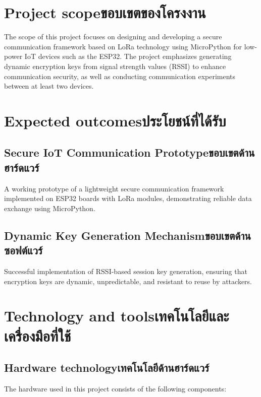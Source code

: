 \section{\ifenglish Project scope\else ขอบเขตของโครงงาน\fi}
The scope of this project focuses on designing and developing a secure communication framework based on LoRa technology using MicroPython for low-power IoT devices such as the ESP32. The project emphasizes generating dynamic encryption keys from signal strength values (RSSI) to enhance communication security, as well as conducting communication experiments between at least two devices.

\section{\ifenglish Expected outcomes\else ประโยชน์ที่ได้รับ\fi}

\subsection{\ifenglish Secure IoT Communication Prototype\else ขอบเขตด้านฮาร์ดแวร์\fi}

A working prototype of a lightweight secure communication framework implemented on ESP32 boards with LoRa modules, demonstrating reliable data exchange using MicroPython.


\subsection{\ifenglish  Dynamic Key Generation Mechanism\else ขอบเขตด้านซอฟต์แวร์\fi}

Successful implementation of RSSI-based session key generation, ensuring that encryption keys are dynamic, unpredictable, and resistant to reuse by attackers.


\section{\ifenglish Technology and tools\else เทคโนโลยีและเครื่องมือที่ใช้\fi}

\subsection{\ifenglish Hardware technology\else เทคโนโลยีด้านฮาร์ดแวร์\fi}
The hardware used in this project consists of the following components:

